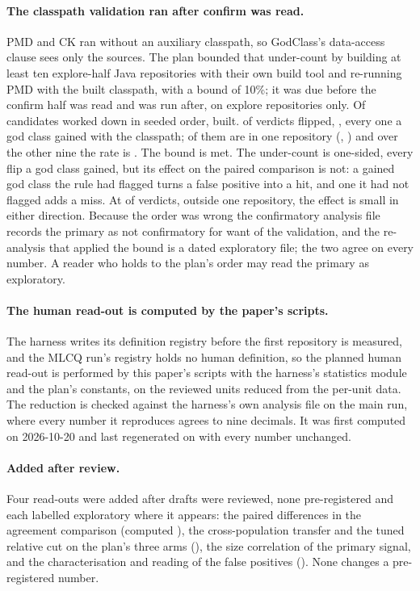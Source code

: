\documentclass[11pt,a4paper]{article}
\begin{document}
\paragraph{The classpath validation ran after confirm was read.} PMD and CK
ran without an auxiliary classpath, so GodClass's data-access clause sees only
the sources. The plan bounded that under-count by building at least ten
explore-half Java repositories with their own build tool and re-running PMD
with the built classpath, with a bound of 10\%; it was due before the confirm
half was read and was run after, on explore repositories only. Of \cpTried{}
candidates worked down in seeded order, \cpRepos{} built. \cpFlips{} of
\cpUnion{} verdicts flipped, \cpRate{}, every one a god class gained with the
classpath; \cpMaxFlips{} of them are in one repository (\cpMaxFlipsRepo{},
\cpMaxFlipsRepoRate{}) and over the other nine the rate is \cpRateExclMax{}.
The bound is met. The under-count is one-sided, every flip a god class
gained, but its effect on the paired comparison is not: a gained god class
the rule had flagged turns a false positive into a hit, and one it had not
flagged adds a miss. At \cpRate{} of verdicts, \cpRateExclMax{} outside one
repository, the effect is small in either direction. Because the order was wrong the confirmatory analysis file
records the primary as not confirmatory for want of the validation, and the
re-analysis that applied the bound is a dated exploratory file; the two agree
on every number. A reader who holds to the plan's order may read the primary
as exploratory.

\paragraph{The human read-out is computed by the paper's scripts.} The
harness writes its definition registry before the first repository is
measured, and the MLCQ run's registry holds no human definition, so the
planned human read-out is performed by this paper's scripts with the harness's
statistics module and the plan's constants, on the reviewed units reduced from
the per-unit data. The reduction is checked against the harness's own analysis
file on the main run, where every number it reproduces agrees to nine
decimals. It was first computed on 2026-10-20 and last regenerated on
\humComputedUtc{} with every number unchanged.

\paragraph{Added after review.} Four read-outs were added after drafts were
reviewed, none pre-registered and each labelled exploratory where it appears:
the paired differences in the agreement comparison (computed
\agrComputedUtc{}), the cross-population transfer and the tuned relative cut
on the plan's three arms (\transferComputedUtc{}), the size correlation of
the primary signal, and the characterisation and reading of the false
positives (\fpComputedUtc{}). None changes a pre-registered number.
\end{document}
